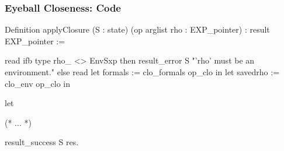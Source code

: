 \documentclass{beamer}
\begin{document}
\begin{frame}[fragile]
    \frametitle{Eyeball Closeness: \Coq{} Code}

\begin{changemargin}{-5mm}{-5mm}
\begin{coqcode}
Definition applyClosure (S : state) (op arglist rho : EXP_pointer)
    : result EXP_pointer :=

  read%
  ifb type rho_ <> EnvSxp then
    result_error S "'rho' must be an environment."
  else
    read%
    let formals := clo_formals op_clo in
    let savedrho := clo_env op_clo in

    let%

    (* ... *)

    result_success S res.
\end{coqcode}
\end{changemargin}

\end{frame}

\end{document}
